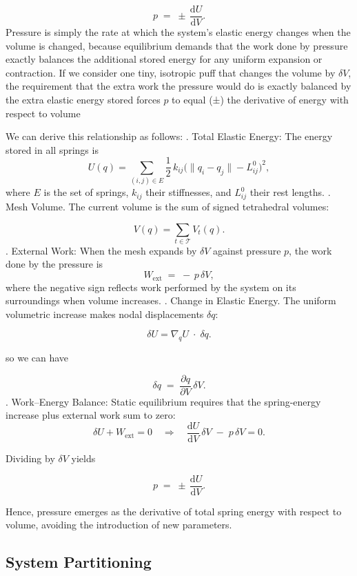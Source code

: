 \documentclass{article}
\begin{document}
$$
  p \;=\;\pm\,\frac{\mathrm dU}{\mathrm dV}.
$$
Pressure is simply the rate at which the system’s elastic energy changes when the volume is changed, 
because equilibrium demands that the work done by pressure exactly balances the additional stored energy 
for any uniform expansion or contraction. If we consider one tiny, isotropic puff that changes the volume by 
$\delta V$, the requirement that the extra work the pressure would do is exactly balanced by the extra elastic energy stored forces 
$p$ to equal (±) the derivative of energy with respect to volume

We can derive this relationship as follows:
. Total Elastic Energy: The energy stored in all springs is
$$
  U(q)
  =
  \sum_{(i,j)\in E}\frac12\,k_{ij}\bigl(\|q_i - q_j\| - L^0_{ij}\bigr)^2,
$$
where $E$ is the set of springs, $k_{ij}$ their stiffnesses, and $L^0_{ij}$ their rest lengths.
. Mesh Volume.
The current volume is the sum of signed tetrahedral volumes:

$$
  V(q)
  =
  \sum_{t\in\mathcal T} V_t(q).
$$
. External Work: When the mesh expands by $\delta V$ against pressure $p$, the work done by the pressure is
$$
  W_{\mathrm{ext}} \;=\; -\,p\,\delta V,
$$
where the negative sign reflects work performed by the system on its surroundings when volume increases.
. Change in Elastic Energy. The uniform volumetric increase makes nodal displacements $\delta q$:

$$
  \delta U = \nabla_q U \;\cdot\;\delta q.
$$

so we can have 

$$
  \delta q \;=\;\frac{\partial q}{\partial V}\,\delta V.
$$
. Work–Energy Balance: Static equilibrium requires that the spring-energy increase plus external work sum to zero:
$$
  \delta U + W_{\mathrm{ext}} = 0
  \quad\Longrightarrow\quad
  \frac{\mathrm dU}{\mathrm dV}\,\delta V \;-\; p\,\delta V = 0.
$$

Dividing by $\delta V$ yields

$$
  p \;=\;\pm\,\frac{\mathrm dU}{\mathrm dV}.
$$

Hence, pressure emerges as the derivative of total spring energy with respect to volume, avoiding the introduction of new parameters.

\subsection{System Partitioning}
\end{document}
